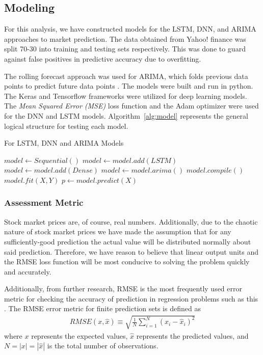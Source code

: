 \documentclass[conference]{IEEEtran}
\begin{document}
\subsection{Modeling}
For this analysis, we have constructed models for the LSTM, DNN, and ARIMA approaches to market prediction.
The data obtained from Yahoo! finance was split 70-30 into training and testing sets respectively.
This was done to guard against false positives in predictive accuracy due to overfitting.

The rolling forecast approach was used for ARIMA, which folds previous data points to predict future data points \cite{hyndman2018forecasting}.
The models were built and run in python.
The Keras and Tensorflow frameworks were utilized for deep learning models.
The \textit{Mean Squared Error (MSE)} loss function and the Adam optimizer were used for the DNN and LSTM models.
Algorithm~\ref{alg:model} represents the general logical structure for testing each model.
\begin{algorithm}[ht]
\begin{algorithmic}[1]
    \caption{For LSTM, DNN and ARIMA Models} \label{alg:model}
        \State $model \gets Sequential()$
        \State $model \gets model.add(LSTM)$ 
        \State $model \gets model.add(Dense)$ 
        \State $model \gets model.arima()$ 
        \State $model.compile()$
        \State $model.fit(X, Y)$
        \State $p \gets model.predict(X)$ 
        \State{}
        \State\Return {} 
    \EndFunction
\end{algorithmic}
\end{algorithm}

\subsubsection{Assessment Metric}
Stock market prices are, of course, real numbers.
Additionally, due to the chaotic nature of stock market prices \cite{lawrence} we have made the assumption that for any sufficiently-good prediction the actual value will be distributed normally about said prediction.
Therefore, we have reason to believe that linear output units and the RMSE loss function will be most conducive to solving the problem quickly and accurately.

Additionally, from further research, RMSE \cite{chai2014root} is the most frequently used error metric for checking the accuracy of prediction in regression problems such as this \cite{siami2018forecasting}.
The RMSE error metric for finite prediction sets is defined as
\begin{align}
    RMSE(x, \hat{x}) \equiv \sqrt{\frac{1}{N} \sum_{i=1}^N{(x_i-\hat{x}_i)^2}}
\end{align}
where $x$ represents the expected values, $\hat{x}$ represents the predicted values, and $N = |x| = |\hat{x}|$ is the total number of observations.
\end{document}
